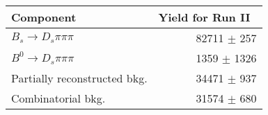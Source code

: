  \begin{tabular}{l r }
\hline\hline
Component & Yield for Run II\ \\
\hline
$B_s \to D_s \pi \pi \pi$ & 82711 $\pm$ 257 \\
$B^{0} \to D_s \pi \pi \pi$ & 1359 $\pm$ 1326 \\
Partially reconstructed bkg. & 34471 $\pm$ 937 \\
Combinatorial bkg. & 31574 $\pm$ 680 \\
\hline\hline
\end{tabular}
\label{table:normYields_run2}
